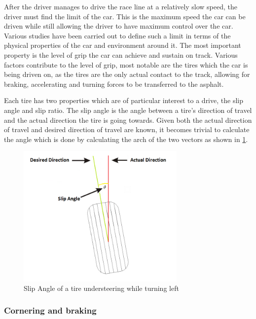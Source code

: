After the driver manages to drive the race line at a relatively slow speed, the driver must find the limit of the car. This is the maximum speed the car can be driven while still allowing the driver to have maximum control over the car. Various studies have been carried out to define such a limit in terms of the physical properties of the car and environment around it. The most important property is the level of grip the car can achieve and sustain on track. Various factors contribute to the level of grip, most notable are the tires which the car is being driven on, as the tires are the only actual contact to the track, allowing for braking, accelerating and turning forces to be transferred to the asphalt\cite{beckman1991physics}.

Each tire has two properties which are of particular interest to a drive, the slip angle and slip ratio. The slip angle is the angle between a tire’s direction of travel and the actual direction the tire is going towards. Given both the actual direction of travel and desired direction of travel are known, it becomes trivial to calculate the angle which is done by calculating the arch of the two vectors as shown in \ref{fig:slipangle}.

\begin{figure}[!htb]
	\centering
	\includegraphics[height=7cm]{images/slipangle}
	\caption{Slip Angle of a tire understeering while turning left}
	\label{fig:slipangle}
\end{figure}

\subsubsection{Cornering and braking}

